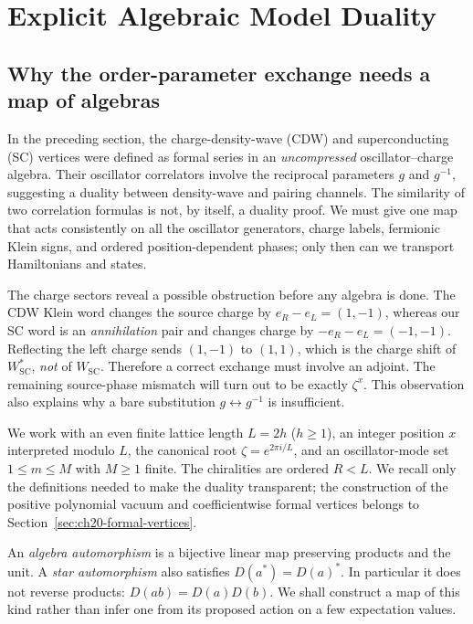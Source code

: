 \section{Explicit Algebraic Model Duality}
\label{sec:ch20-model-duality}

\subsection{Why the order-parameter exchange needs a map of algebras}
\label{subsec:ch20c-motivation}

In the preceding section, the charge-density-wave (CDW) and
superconducting (SC) vertices were defined as formal series in an
\emph{uncompressed} oscillator--charge algebra.  Their oscillator
correlators involve the reciprocal parameters $g$ and $g^{-1}$,
suggesting a duality between density-wave and pairing channels.  The
similarity of two correlation formulas is not, by itself, a duality
proof.  We must give one map that acts consistently on all the
oscillator generators, charge labels, fermionic Klein signs, and
ordered position-dependent phases; only then can we transport
Hamiltonians and states.

The charge sectors reveal a possible obstruction before any algebra
is done.  The CDW Klein word changes the source charge by
$e_R-e_L=(1,-1)$, whereas our SC word is an \emph{annihilation}
pair and changes charge by $-e_R-e_L=(-1,-1)$.  Reflecting the left
charge sends $(1,-1)$ to $(1,1)$, which is the charge shift of
$W_{\mathrm{SC}}^*$, \emph{not} of $W_{\mathrm{SC}}$.  Therefore a
correct exchange must involve an adjoint.  The remaining source-phase
mismatch will turn out to be exactly $\zeta^x$.  This observation
also explains why a bare substitution $g\leftrightarrow g^{-1}$ is
insufficient.

We work with an even finite lattice length $L=2h$ ($h\geq1$), an
integer position $x$ interpreted modulo $L$, the canonical root
$\zeta=e^{2\pi i/L}$, and an oscillator-mode set $1\leq m\leq M$
with $M\geq1$ finite.  The chiralities are ordered $R<L$.  We recall
only the definitions needed to make the duality transparent; the
construction of the positive polynomial vacuum and coefficientwise
formal vertices belongs to Section~\ref{sec:ch20-formal-vertices}.

An \emph{algebra automorphism} is a bijective linear map preserving
products and the unit.  A \emph{star automorphism} also satisfies
$D(a^*)=D(a)^*$.  In particular it does not reverse products:
$D(ab)=D(a)D(b)$.  We shall construct a map of this kind rather
than infer one from its proposed action on a few expectation values.

